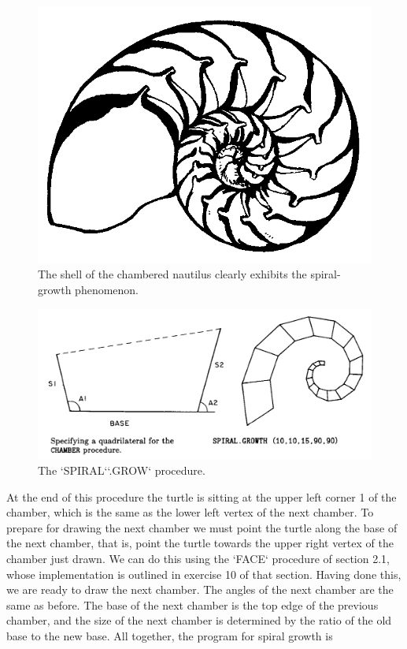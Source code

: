 \documentclass{book}
\begin{document}
\begin{figure}
\begin{center}
\includegraphics[scale=1]{fig2-16}
\caption{The shell of the chambered nautilus clearly exhibits the spiral-growth phenomenon.}
\end{center}
\end{figure}

\begin{figure}
\begin{center}
\includegraphics[scale=1]{fig2-17}
\caption{The \textsc{`SPIRAL`}\textsc{`.GROW`} procedure.}
\end{center}
\end{figure}

At the end of this procedure the turtle is sitting at the upper left corner
1 of the chamber, which is the same as the lower left vertex of the next
chamber. To prepare for drawing the next chamber we must point the
turtle along the base of the next chamber, that is, point the turtle
towards the upper right vertex of the chamber just drawn. We can do
this using the \textsc{`FACE`} procedure of section 2.1, whose implementation is
outlined in exercise 10 of that section. Having done this, we are ready
to draw the next chamber. The angles of the next chamber are the same
as before. The base of the next chamber is the top edge of the previous
chamber, and the size of the next chamber is determined by the ratio
of the old base to the new base. All together, the program for spiral
growth is
\end{document}
